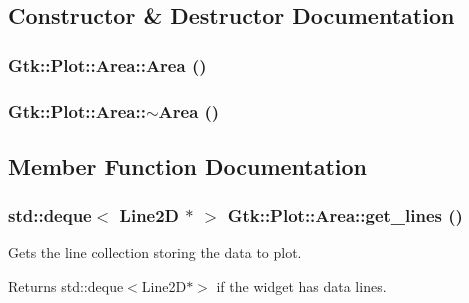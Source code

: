 \subsection{Constructor \& Destructor Documentation}
\hypertarget{classGtk_1_1Plot_1_1Area_a0620d8e15c28422e302152fe086436ad}{
\subsubsection[{Area}]{\setlength{\rightskip}{0pt plus 5cm}Gtk::Plot::Area::Area ()}}
\label{classGtk_1_1Plot_1_1Area_a0620d8e15c28422e302152fe086436ad}
\hypertarget{classGtk_1_1Plot_1_1Area_a474a966b91e311f5591718135a850b48}{
\subsubsection[{$\sim$Area}]{\setlength{\rightskip}{0pt plus 5cm}Gtk::Plot::Area::$\sim$Area ()}}
\label{classGtk_1_1Plot_1_1Area_a474a966b91e311f5591718135a850b48}


\subsection{Member Function Documentation}
\hypertarget{classGtk_1_1Plot_1_1Area_a3d63a496f6d7d604aeae17e7f85beda9}{
\subsubsection[{get\_\-lines}]{\setlength{\rightskip}{0pt plus 5cm}std::deque$<$ {\bf Line2D} $\ast$ $>$ Gtk::Plot::Area::get\_\-lines ()}}
\label{classGtk_1_1Plot_1_1Area_a3d63a496f6d7d604aeae17e7f85beda9}


Gets the line collection storing the data to plot. \begin{DoxyReturn}{Returns}
{\ttfamily std::deque$<$Line2D$\ast$$>$} if the widget has data lines. 
\end{DoxyReturn}

